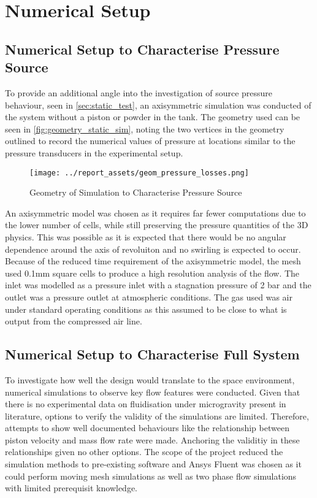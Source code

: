 \section{Numerical Setup}\label{sec:numerical-setup}
\subsection{Numerical Setup to Characterise Pressure Source}
To provide an additional angle into the investigation of source pressure behaviour, seen in \autoref{sec:static_test}, an axisymmetric simulation was conducted of the system without a piston or powder in the tank. The geometry used can be seen in \autoref{fig:geometry_static_sim}, noting the two vertices in the geometry outlined to record the numerical values of pressure at locations similar to the pressure transducers in the experimental setup.
\begin{figure}[htbp]
    \centering
    
    \begin{minipage}{0.9\textwidth}
        \centering
        \texttt{[image: ../report\_assets/geom\_pressure\_losses.png]}
        \caption{Geometry of Simulation to Characterise Pressure Source}\label{fig:geometry_static_sim}
    \end{minipage}
    
\end{figure}
An axisymmetric model was chosen as it requires far fewer computations due to the lower number of cells, while still preserving the pressure quantities of the 3D physics. This was possible as it is expected that there would be no angular dependence around the axis of revoluiton and no swirling is expected to occur. Because of the reduced time requirement of the axisymmetric model, the mesh used 0.1mm square cells to produce a high resolution analysis of the flow. The inlet was modelled as a pressure inlet with a stagnation pressure of 2 bar and the outlet was a pressure outlet at atmospheric conditions. The gas used was air under standard operating conditions as this assumed to be close to what is output from the compressed air line.
\subsection{Numerical Setup to Characterise Full System}
To investigate how well the design would translate to the space environment, numerical simulations to observe key flow features were conducted. Given that there is no experimental data on fluidisation under microgravity present in literature, options to verify the validity of the simulations are limited. Therefore, attempts to show well documented behaviours like the relationship between piston velocity and mass flow rate were made. Anchoring the validitiy in these relationships given no other options. The scope of the project reduced the simulation methods to pre-existing software and Ansys Fluent was chosen as it could perform moving mesh simulations as well as two phase flow simulations with limited prerequisit knowledge.

